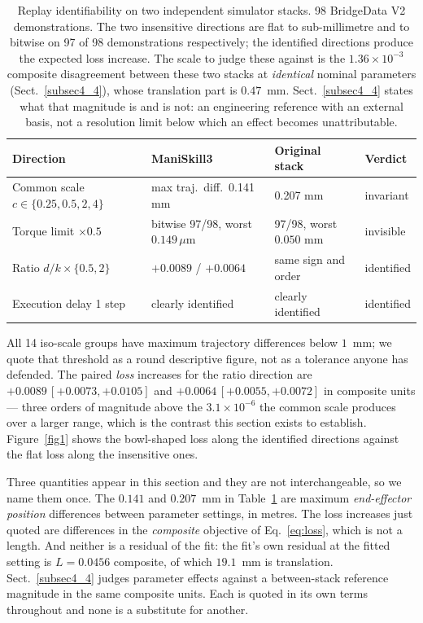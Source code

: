 \documentclass[pdflatex,iicol,sn-apa]{sn-jnl}
\theoremstyle{remark}
\begin{document}
\begin{table}[t]
\caption{Replay identifiability on two independent simulator stacks. 98 BridgeData V2
demonstrations. The two insensitive directions are flat to sub-millimetre and to bitwise on 97 of 98
demonstrations respectively; the identified directions produce the expected loss increase. The scale
to judge these against is the $1.36\times10^{-3}$ composite disagreement between these two stacks at
\emph{identical} nominal parameters (Sect.~\ref{subsec4_4}), whose translation part is $0.47$~mm.
Sect.~\ref{subsec4_4} states what that magnitude is and is not: an engineering reference with an
external basis, not a resolution limit below which an effect becomes unattributable.}\label{tab1}
\begin{tabular}{@{}llll@{}}
\toprule
Direction & ManiSkill3 & Original stack & Verdict \\
\midrule
Common scale $c \in \{0.25, 0.5, 2, 4\}$ & max traj.\ diff.\ 0.141 mm & 0.207 mm & invariant \\
Torque limit $\times 0.5$ & bitwise 97/98, worst $0.149\,\mu$m & 97/98, worst $0.050$ mm & invisible \\
Ratio $d/k \times \{0.5, 2\}$ & $+0.0089$ / $+0.0064$ & same sign and order & identified \\
Execution delay 1 step & clearly identified & clearly identified & identified \\
\bottomrule
\end{tabular}
\end{table}

All 14 iso-scale groups have maximum trajectory differences below $1$~mm; we quote that threshold
as a round descriptive figure, not as a tolerance anyone has defended. The paired \emph{loss} increases for
the ratio direction are $+0.0089\,[+0.0073, +0.0105]$ and $+0.0064\,[+0.0055, +0.0072]$ in composite
units --- three orders of magnitude above the $3.1\times10^{-6}$ the common scale produces over a
larger range, which is the contrast this section exists to establish. Figure~\ref{fig1} shows the
bowl-shaped loss along the identified directions against the flat loss along the insensitive ones.

Three quantities appear in this section and they are not interchangeable, so we name them once. The
$0.141$ and $0.207$~mm in Table~\ref{tab1} are maximum \emph{end-effector position} differences
between parameter settings, in metres. The loss increases just quoted are differences in the
\emph{composite} objective of Eq.~\eqref{eq:loss}, which is not a length. And neither is a residual
of the fit: the fit's own residual at the fitted setting is $L = 0.0456$ composite, of which
$19.1$~mm is translation. Sect.~\ref{subsec4_4} judges parameter effects against a between-stack
reference magnitude in the same composite units. Each is quoted in its own terms throughout and none
is a substitute for another.
\end{document}
